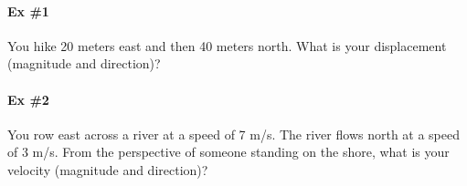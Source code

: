 \documentclass[11pt]{article}
\begin{document}
\pagestyle{empty}

\paragraph{Ex \#1} 

You hike 20 meters east and then 40 meters north.  What is your displacement (magnitude and direction)?

\begin{center}
\end{center}

\pagebreak

\paragraph{Ex \#2} 

You row east across a river at a speed of 7 m/s.  The river flows north at a speed of 3 m/s.  From the perspective of someone standing on the shore, what is your velocity (magnitude and direction)?
\end{document}
